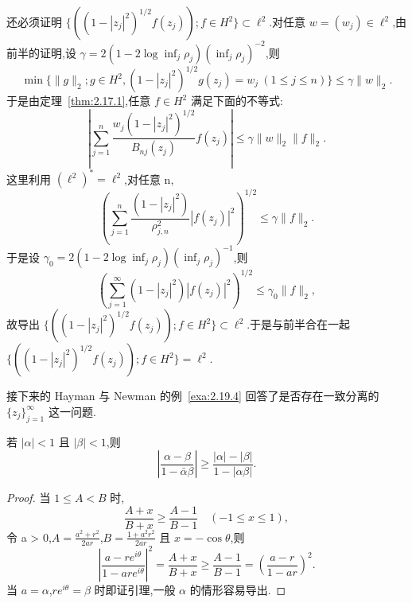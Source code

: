 还必须证明 $\{((1 - |z_{j}|^{2})^{1/2}f(z_{j})); f \in H^{2}\} \subset \ell^{2}$.对任意 $w = (w_{j}) \in \ell^{2}$,由前半的证明,设 $\gamma = 2(1 - 2\log\inf_{j}\rho_{j})(\inf_{j}\rho_{j})^{-2}$,则
\begin{equation*}
\min \{\|g\|_{2}; g \in H^{2}, (1 - |z_{j}|^{2})^{1/2}g(z_{j}) = w_{j} \ (1 \leq j \leq n)\} \leq \gamma\|w\|_{2}.
\end{equation*}
于是由定理~\ref{thm:2.17.1},任意 $f \in H^{2}$ 满足下面的不等式:
\begin{equation*}
\left| \sum_{j=1}^{n} \frac{w_{j}(1 - |z_{j}|^{2})^{1/2}}{B_{nj}(z_{j})} f(z_{j}) \right| \leq \gamma\|w\|_{2}\|f\|_{2}.
\end{equation*}
这里利用 $(\ell^{2})^{*} = \ell^{2}$,对任意 n,
\begin{equation*}
\left(\sum_{j=1}^{n}\frac{(1 - |z_{j}|^{2})}{\rho_{j,n}^{2}}|f(z_{j})|^{2}\right)^{1/2} \leq \gamma\|f\|_{2}.
\end{equation*}
于是设 $\gamma_{0} = 2(1 - 2\log\inf_{j}\rho_{j})(\inf_{j}\rho_{j})^{-1}$,则
\begin{equation*}
\left(\sum_{j=1}^{\infty}(1 - |z_{j}|^{2})|f(z_{j})|^{2}\right)^{1/2} \leq \gamma_{0}\|f\|_{2},
\end{equation*}
故导出 $\{((1 - |z_{j}|^{2})^{1/2}f(z_{j})); f \in H^{2}\} \subset \ell^{2}$.于是与前半合在一起 $\{((1 - |z_{j}|^{2})^{1/2}f(z_{j})); f \in H^{2}\} = \ell^{2}$.

接下来的 Hayman \cite{ch2:19} 与 Newman \cite{ch2:20} 的例~\ref{exa:2.19.4} 回答了是否存在一致分离的 $\{z_{j}\}_{j=1}^{\infty}$ 这一问题.

\begin{lemma}\label{lem:2.19.3}
若 $|\alpha| < 1$ 且 $|\beta| < 1$,则
\begin{equation*}
\left| \frac{\alpha - \beta}{1 - \bar{\alpha}\beta} \right| \geq \frac{|\alpha| - |\beta|}{1 - |\alpha\beta|}.
\end{equation*}
\end{lemma}

\begin{proof}
当 $1 \leq A < B$ 时,
\begin{equation*}
\frac{A + x}{B + x} \geq \frac{A - 1}{B - 1} \quad (-1 \leq x \leq 1),
\end{equation*}
令 a > 0,$A = \frac{a^{2} + r^{2}}{2ar}$,$B = \frac{1 + a^{2}r^{2}}{2ar}$ 且 $x = -\cos\theta$,则
\begin{equation*}
\left| \frac{a - re^{i\theta}}{1 - are^{i\theta}} \right|^{2} = \frac{A + x}{B + x} \geq \frac{A - 1}{B - 1} = \left(\frac{a - r}{1 - ar}\right)^{2}.
\end{equation*}
当 $a = \alpha$,$re^{i\theta} = \beta$ 时即证引理,一般 $\alpha$ 的情形容易导出.
\end{proof}

